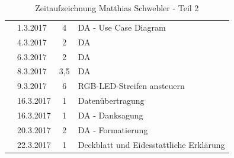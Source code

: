 \documentclass[12pt]{article}
\begin{document}
\begin{table}[hp]
\begin{tabular}{|l|l|c|l|}
                                                                                       & 1.3.2017                            & 4                    & DA - Use Case Diagram                                                                                   \\ \cline{2-4} 
                                                                                       & 4.3.2017                            & 2                    & DA                                                                                                      \\ \cline{2-4} 
                                                                                       & 6.3.2017                            & 2                    & DA                                                                                                      \\ \cline{2-4} 
                                                                                       & 8.3.2017                            & 3,5                  & DA                                                                                                      \\ \cline{2-4} 
                                                                                       & 9.3.2017                            & 6                    & RGB-LED-Streifen ansteuern                                                                              \\ \cline{2-4} 
                                                                                       & 16.3.2017                           & 1                    & Datenübertragung                                                                                        \\ \cline{2-4} 
                                                                                       & 16.3.2017                           & 1                    & DA - Danksagung                                                                                         \\ \cline{2-4} 
                                                                                       & 20.3.2017                           & 2                    & DA - Formatierung                                                                                       \\ \cline{2-4} 
                                                                                       & 22.3.2017                           & 1                    & Deckblatt und Eidesstattliche Erklärung                                                                 \\ \hline
\end{tabular}
\caption{Zeitaufzeichnung Matthias Schwebler - Teil 2}
\end{table}
\end{document}
